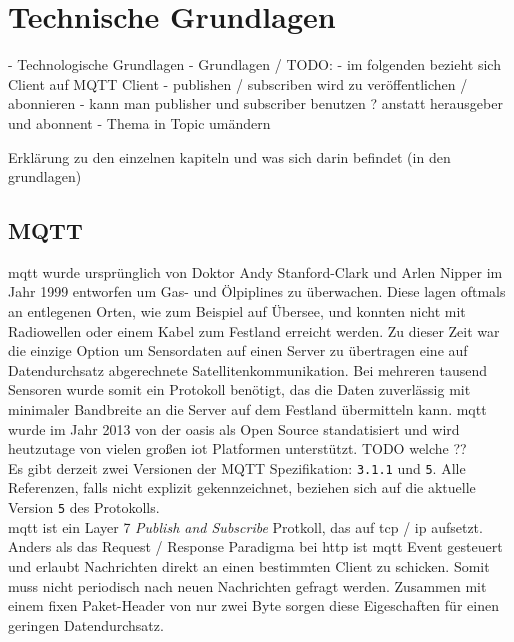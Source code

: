 \section{Technische Grundlagen} - Technologische Grundlagen - Grundlagen /
TODO:
- im folgenden bezieht sich Client auf MQTT Client
- publishen / subscriben wird zu veröffentlichen / abonnieren
- kann man publisher und subscriber benutzen ? anstatt herausgeber und abonnent
- Thema in Topic umändern

Erklärung zu den einzelnen kapiteln und was sich darin befindet (in den grundlagen)
\subsection{MQTT}
\acf{mqtt} wurde ursprünglich von Doktor Andy Stanford-Clark und Arlen Nipper im Jahr 1999 entworfen um Gas- und Ölpiplines zu überwachen. Diese lagen oftmals an entlegenen Orten, wie zum Beispiel auf Übersee, und konnten nicht mit Radiowellen oder einem Kabel zum Festland erreicht werden. Zu dieser Zeit war die einzige Option um Sensordaten auf einen Server zu übertragen eine auf Datendurchsatz abgerechnete Satellitenkommunikation. Bei mehreren tausend Sensoren wurde somit ein Protokoll benötigt, das die Daten zuverlässig mit minimaler Bandbreite an die Server auf dem Festland übermitteln kann.
\ac{mqtt} wurde im Jahr 2013 von der \ac{oasis} als Open Source standatisiert und wird heutzutage von vielen gro{\ss}en \ac{iot} Platformen unterstützt. TODO welche ??\cite{WhatMQTTDefinition}\\
Es gibt derzeit zwei Versionen der MQTT Spezifikation: \verb|3.1.1| und \verb|5|. Alle Referenzen, falls nicht explizit gekennzeichnet, beziehen sich auf die aktuelle Version \verb|5| des Protokolls.\\
\ac{mqtt} ist ein Layer 7 \textit{Publish and Subscribe} Protkoll, das auf \acs{tcp} / \acs{ip} aufsetzt. Anders als das Request / Response Paradigma bei \acs{http} ist \ac{mqtt} Event gesteuert und erlaubt Nachrichten direkt an einen bestimmten Client zu schicken. Somit muss nicht periodisch nach neuen Nachrichten gefragt werden. Zusammen mit einem fixen Paket-Header von nur zwei Byte sorgen diese Eigeschaften für einen geringen Datendurchsatz.\cite{WhatMQTTDefinition}

